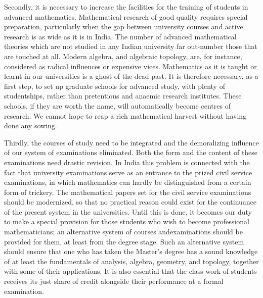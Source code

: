 Secondly, it is necessary to increase the facilities for the training of students in advanced mathematics. Mathematical research of good quality requires special preparation, particularly when the gap between university courses and active research is as wide as it is in India. The number of advanced mathematical theories which are not studied in any Indian university far out-number those that are touched at all. Modern algebra, and algebraic topology, are, for instance, considered as radical influences or expensive vices. Mathematics as it is taught or learnt in our universities is a ghost of the dead past. It is therefore necessary, as a first step, to set up graduate schools for advanced study, with plenty of studentships, rather than pretentious and anaemic research institutes. These schools, if they are worth the name, will automatically become centres of research. We cannot hope to reap a rich mathematical harvest without having done any sowing.

Thirdly, the courses of study need to be integrated and the demoralizing influence of our system of examinations eliminated. Both the form and the content of these examinations need drastic revision. In India this problem is connected with the fact that university examinations serve as an entrance to the prized civil service examinations, in which mathematics can hardly be distinguished from a certain form of trickery. The mathematical papers set for the civil service examinations should be modernized, so that no practical reason could exist for the continuance of the present system in the universities. Until this is done, it becomes our duty to make a special provision for those students who wish to become professional mathematicians; an alternative system of courses and\pageoriginale examinations should be provided for them, at least from the degree stage. Such an alternative system should ensure that one who has taken the Master's degree has a sound knowledge of at least the fundamentals of analysis, algebra, geometry, and topology, together with some of their applications. It is also essential that the class-work of students receives its just share of credit alongside their performance at a formal examination.

\newpage

